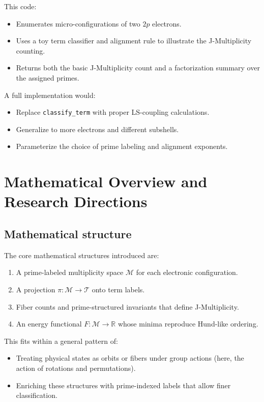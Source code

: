 \documentclass[11pt]{article}
\begin{document}
This code:
\begin{itemize}
  \item Enumerates micro-configurations of two \(2p\) electrons.
  \item Uses a toy term classifier and alignment rule to illustrate the J-Multiplicity counting.
  \item Returns both the basic J-Multiplicity count and a factorization summary over the assigned primes.
\end{itemize}

A full implementation would:
\begin{itemize}
  \item Replace \texttt{classify\_term} with proper LS-coupling calculations.
  \item Generalize to more electrons and different subshells.
  \item Parameterize the choice of prime labeling and alignment exponents.
\end{itemize}

\section{Mathematical Overview and Research Directions}

\subsection{Mathematical structure}

The core mathematical structures introduced are:
\begin{enumerate}
  \item A prime-labeled multiplicity space \(\mathcal{M}\) for each electronic configuration.
  \item A projection \(\pi: \mathcal{M} \to \mathcal{T}\) onto term labels.
  \item Fiber counts and prime-structured invariants that define J-Multiplicity.
  \item An energy functional \(F: \mathcal{M} \to \mathbb{R}\) whose minima reproduce Hund-like ordering.
\end{enumerate}

This fits within a general pattern of:
\begin{itemize}
  \item Treating physical states as orbits or fibers under group actions (here, the action of rotations and permutations).
  \item Enriching these structures with prime-indexed labels that allow finer classification.
\end{itemize}
\end{document}
